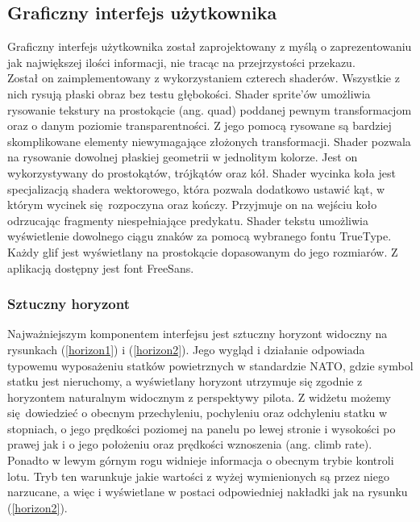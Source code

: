 \subsection{Graficzny interfejs użytkownika}

Graficzny interfejs użytkownika został zaprojektowany z myślą o zaprezentowaniu jak największej ilości informacji, nie tracąc na przejrzystości przekazu.
\\

Został on zaimplementowany z wykorzystaniem czterech shaderów. Wszystkie z nich rysują płaski obraz bez testu głębokości. Shader sprite'ów umożliwia rysowanie tekstury na prostokącie (ang. quad) poddanej pewnym transformacjom oraz o danym poziomie transparentności. Z jego pomocą rysowane są bardziej skomplikowane elementy niewymagające złożonych transformacji. Shader pozwala na rysowanie dowolnej płaskiej geometrii w jednolitym kolorze. Jest on wykorzystywany do prostokątów, trójkątów oraz kół. Shader wycinka koła jest specjalizacją shadera wektorowego, która pozwala dodatkowo ustawić kąt, w którym wycinek się rozpoczyna oraz kończy. Przyjmuje on na wejściu koło odrzucając fragmenty niespełniające predykatu. Shader tekstu umożliwia wyświetlenie dowolnego ciągu znaków za pomocą wybranego fontu TrueType. Każdy glif jest wyświetlany na prostokącie dopasowanym do jego rozmiarów. Z aplikacją dostępny jest font FreeSans.

\subsubsection{Sztuczny horyzont}

Najważniejszym komponentem interfejsu jest sztuczny horyzont widoczny na rysunkach (\ref{horizon1}) i (\ref{horizon2}). Jego wygląd i działanie odpowiada typowemu wyposażeniu statków powietrznych w standardzie NATO, gdzie symbol statku jest nieruchomy, a wyświetlany horyzont utrzymuje się zgodnie z horyzontem naturalnym widocznym z perspektywy pilota. Z widżetu możemy się dowiedzieć o obecnym przechyleniu, pochyleniu oraz odchyleniu statku w stopniach, o jego prędkości poziomej na panelu po lewej stronie i wysokości po prawej jak i o jego położeniu oraz prędkości wznoszenia (ang. climb rate). Ponadto w lewym górnym rogu widnieje informacja o obecnym trybie kontroli lotu. Tryb ten warunkuje jakie wartości z wyżej wymienionych są przez niego narzucane, a więc i wyświetlane w postaci odpowiedniej nakładki jak na rysunku (\ref{horizon2}).




